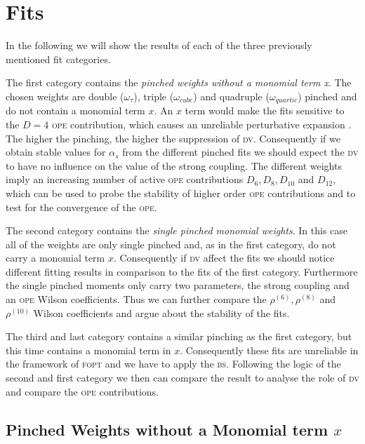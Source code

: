 \documentclass[../../index.tex]{subfiles}
\begin{document}
\section{Fits}
In the following we will show the results of each of the three previously
mentioned fit categories.

The first category contains the \textit{pinched weights without a monomial term
  x}. The chosen weights are double (\(\omega_\tau\)), triple
(\(\omega_{cube}\)) and quadruple (\(\omega_{quartic}\)) pinched and do not
contain a monomial term \(x\). An \(x\) term would make the fits sensitive to
the \(D=4\) \textsc{ope} contribution, which causes an unreliable perturbative
expansion \cite{Beneke2012}. The higher the pinching, the higher the suppression
of \textsc{dv}. Consequently if we obtain stable values for \(\alpha_s\) from
the different pinched fits we should expect the \textsc{dv} to have no influence
on the value of the strong coupling. The different weights imply an increasing
number of active \textsc{ope} contributions \(D_6, D_8, D_{10}\) and \(D_{12}\),
which can be used to probe the stability of higher order \textsc{ope}
contributions and to test for the convergence of the \textsc{ope}.

The second category contains the \textit{single pinched monomial weights}. In
this case all of the weights are only single pinched and, as in the first
category, do not carry a monomial term \(x\). Consequently if \textsc{dv} affect
the fits we should notice different fitting results in comparison to the fits of
the first category. Furthermore the single pinched moments only carry two
parameters, the strong coupling and an \textsc{ope} Wilson coefficients. Thus we
can further compare the \(\rho^{(6)}, \rho^{(8)}\) and \(\rho^{(10)}\) Wilson
coefficients and argue about the stability of the fits.

The third and last category contains a similar pinching as the first category,
but this time contains a monomial term in \(x\). Consequently these fits are
unreliable in the framework of \textsc{fopt} and we have to apply the
\textsc{bs}. Following the logic of the second and first category we
then can compare the result to analyse the role of \textsc{dv} and compare the
\textsc{ope} contributions.

\subsection{Pinched Weights without a Monomial term \(x\)}
\end{document}

